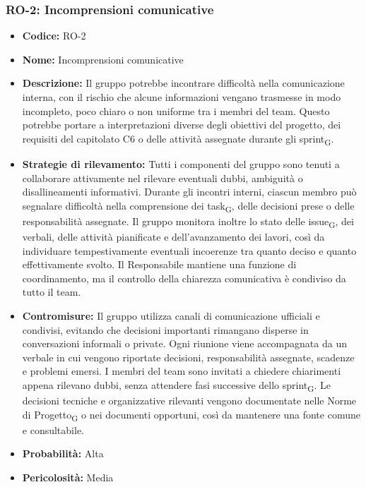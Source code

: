 ﻿\documentclass[a4paper, 10pt, colorlinks=true, linkcolor=black, urlcolor=blue, citecolor=blue, hidelinks]{article}
\begin{document}
\subsubsection{RO-2: Incomprensioni comunicative}

\begin{itemize}
    \item \textbf{Codice:} RO-2

    \item \textbf{Nome:} Incomprensioni comunicative

    \item \textbf{Descrizione:} Il gruppo potrebbe incontrare difficoltà nella comunicazione interna, con il rischio che alcune informazioni vengano trasmesse in modo incompleto, poco chiaro o non uniforme tra i membri del team. Questo potrebbe portare a interpretazioni diverse degli obiettivi del progetto, dei requisiti del capitolato C6 o delle attività assegnate durante gli sprint\textsubscript{G}. 

    \item \textbf{Strategie di rilevamento:} Tutti i componenti del gruppo sono tenuti a collaborare attivamente nel rilevare eventuali dubbi, ambiguità o disallineamenti informativi. Durante gli incontri interni, ciascun membro può segnalare difficoltà nella comprensione dei task\textsubscript{G}, delle decisioni prese o delle responsabilità assegnate. Il gruppo monitora inoltre lo stato delle issue\textsubscript{G}, dei verbali, delle attività pianificate e dell'avanzamento dei lavori, così da individuare tempestivamente eventuali incoerenze tra quanto deciso e quanto effettivamente svolto. Il Responsabile mantiene una funzione di coordinamento, ma il controllo della chiarezza comunicativa è condiviso da tutto il team.

    \item \textbf{Contromisure:} Il gruppo utilizza canali di comunicazione ufficiali e condivisi, evitando che decisioni importanti rimangano disperse in conversazioni informali o private. Ogni riunione viene accompagnata da un verbale in cui vengono riportate decisioni, responsabilità assegnate, scadenze e problemi emersi. I membri del team sono invitati a chiedere chiarimenti appena rilevano dubbi, senza attendere fasi successive dello sprint\textsubscript{G}. Le decisioni tecniche e organizzative rilevanti vengono documentate nelle Norme di Progetto\textsubscript{G} o nei documenti opportuni, così da mantenere una fonte comune e consultabile.

    \item \textbf{Probabilità:} Alta

    \item \textbf{Pericolosità:} Media
\end{itemize}
\end{document}
